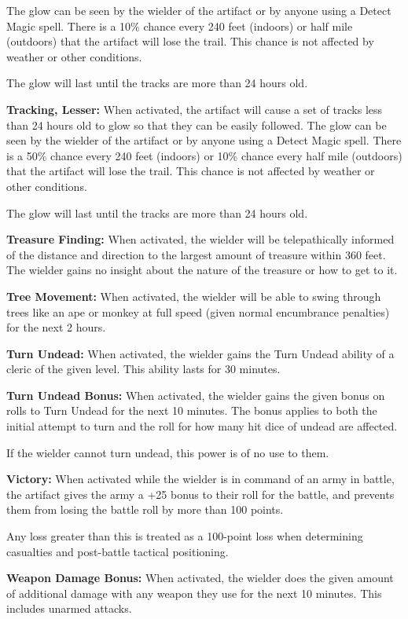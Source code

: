 \begin{multicols*}{2}
The glow can be seen by the wielder of the artifact or by anyone using a Detect Magic spell. There is a 10\% chance every 240 feet (indoors) or half mile (outdoors) that the artifact will lose the trail. This chance is not affected by weather or other conditions.

The glow will last until the tracks are more than 24 hours old.

\textbf{Tracking, Lesser:} When activated, the artifact will cause a set of tracks less than 24 hours old to glow so that they can be easily followed. The glow can be seen by the wielder of the artifact or by anyone using a Detect Magic spell. There is a 50\% chance every 240 feet (indoors) or 10\% chance every half mile (outdoors) that the artifact will lose the trail. This chance is not affected by weather or other conditions.

The glow will last until the tracks are more than 24 hours old.

\textbf{Treasure Finding:} When activated, the wielder will be telepathically informed of the distance and direction to the largest amount of treasure within 360 feet. The wielder gains no insight about the nature of the treasure or how to get to it.

\textbf{Tree Movement:} When activated, the wielder will be able to swing through trees like an ape or monkey at full speed (given normal encumbrance penalties) for the next 2 hours.

\textbf{Turn Undead:} When activated, the wielder gains the Turn Undead ability of a cleric of the given level. This ability lasts for 30 minutes.

\textbf{Turn Undead Bonus:} When activated, the wielder gains the given bonus on rolls to Turn Undead for the next 10 minutes. The bonus applies to both the initial attempt to turn and the roll for how many hit dice of undead are affected.

If the wielder cannot turn undead, this power is of no use to them.

\textbf{Victory:} When activated while the wielder is in command of an army in battle, the artifact gives the army a +25 bonus to their roll for the battle, and prevents them from losing the battle roll by more than 100 points.

Any loss greater than this is treated as a 100-point loss when determining casualties and post-battle tactical positioning.

\textbf{Weapon Damage Bonus:} When activated, the wielder does the given amount of additional damage with any weapon they use for the next 10 minutes. This includes unarmed attacks.


\end{multicols*}

